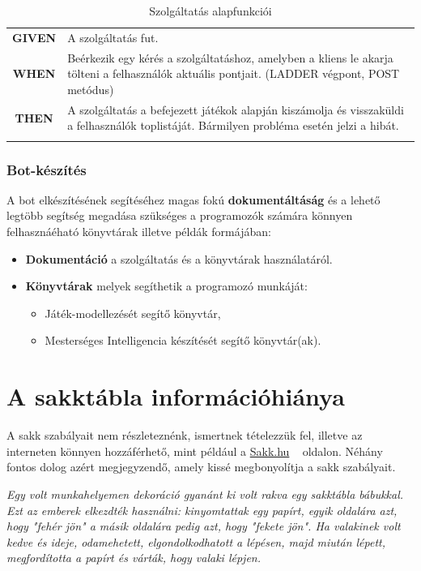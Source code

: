 \documentclass[twoside, a4paper, 12pt]{book}
\begin{document}
\begin{longtable}[c]{|c|p{14cm}|}
	\textbf{GIVEN} &
	A szolgáltatás fut.
	\\ \nobreakhline
	
	\textbf{WHEN} &
	Beérkezik egy kérés a szolgáltatáshoz, amelyben a kliens le akarja tölteni a felhasználók aktuális pontjait. (LADDER végpont, POST metódus)
	\\
	\nobreakhline
	
	\textbf{THEN} &
	A szolgáltatás a befejezett játékok alapján kiszámolja és visszaküldi a felhasználók toplistáját.
	Bármilyen probléma esetén jelzi a hibát.
	\\
	\hline
	
	\caption{Szolgáltatás alapfunkciói}
	\label{userStories:server:api}\\
\end{longtable} 

\subsubsection{Bot-készítés}
A bot elkészítésének segítéséhez magas fokú \textbf{dokumentáltáság} és a lehető legtöbb segítség megadása szükséges a programozók számára könnyen felhasznáéható könyvtárak illetve példák formájában:
\begin{itemize}
	\item \textbf{Dokumentáció} a szolgáltatás és a könyvtárak használatáról.
	\item \textbf{Könyvtárak} melyek segíthetik a programozó munkáját:
	\begin{itemize}
		\item Játék-modellezését segítő könyvtár,
		\item Mesterséges Intelligencia készítését segítő könyvtár(ak).
	\end{itemize}
\end{itemize}

\section{A sakktábla információhiánya}\label{A Sakktábla információhiánya}
A sakk szabályait nem részleteznénk, ismertnek tételezzük fel, illetve az interneten könnyen hozzáférhető, mint például a \href{http://www.sakk.hu/help/sakk_szabalyok.html}{Sakk.hu} ~\cite{chessrulessakkhu} oldalon. Néhány fontos dolog azért megjegyzendő, amely kissé megbonyolítja a sakk szabályait.

\textit{Egy volt munkahelyemen dekoráció gyanánt ki volt rakva egy sakktábla bábukkal. Ezt az emberek elkezdték használni: kinyomtattak egy papírt, egyik oldalára azt, hogy "fehér jön" a másik oldalára pedig azt, hogy "fekete jön". Ha valakinek volt kedve és ideje, odamehetett, elgondolkodhatott a lépésen, majd miután lépett, megfordította a papírt és várták, hogy valaki lépjen.}
\end{document}
